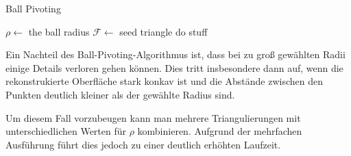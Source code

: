\begin{algorithm}
\caption[Ball Pivoting]{Ball Pivoting \cite[Abs. 4]{bernardini1999ball}}
\label{alg:ball-pivoting}
\begin{algorithmic}
\State $\rho \gets$ the ball radius
\State $\mathcal{F} \gets$ seed triangle
			\State do stuff %
		\EndIf
	\EndWhile
\EndWhile
\end{algorithmic}
\end{algorithm}

Ein Nachteil des Ball-Pivoting-Algorithmus ist, dass bei zu groß gewählten Radii einige Details verloren gehen können.
Dies tritt insbesondere dann auf, wenn die rekonstrukierte Oberfläche stark konkav ist und die Abstände zwischen den Punkten deutlich kleiner als der gewählte Radius sind.

Um diesem Fall vorzubeugen kann man mehrere Triangulierungen mit unterschiedlichen Werten für $\rho$ kombinieren.
Aufgrund der mehrfachen Ausführung führt dies jedoch zu einer deutlich erhöhten Laufzeit.